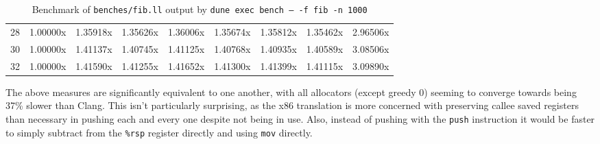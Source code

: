 \documentclass{article}
\begin{document}
\begin{table}[!h]
\begin{center}
\begin{NiceTabular}{|c|cccccccc|}
28 &  1.00000x&  1.35918x&  1.35626x&  1.36006x&  1.35674x&  1.35812x&  1.35462x&  2.96506x\\
30 &  1.00000x&  1.41137x&  1.40745x&  1.41125x&  1.40768x&  1.40935x&  1.40589x&  3.08506x\\
32 &  1.00000x&  1.41590x&  1.41255x&  1.41652x&  1.41300x&  1.41399x&  1.41115x&  3.09890x\\
\hline
\end{NiceTabular}
\caption{\label{demo-table}Benchmark of \texttt{benches/fib.ll} output by \texttt{dune exec bench -- -f fib -n 1000}}
\end{center}
\end{table}
The above measures are significantly equivalent to one another, with all allocators (except greedy 0) seeming to converge towards being 37\% slower than Clang. This isn't particularly surprising, as the x86 translation is more concerned with preserving callee saved registers than necessary in pushing each and every one despite not being in use. Also, instead of pushing with the \lstinline!push! instruction it would be faster to simply subtract from the \lstinline!%rsp! register directly and using \lstinline!mov! directly.
\end{document}
